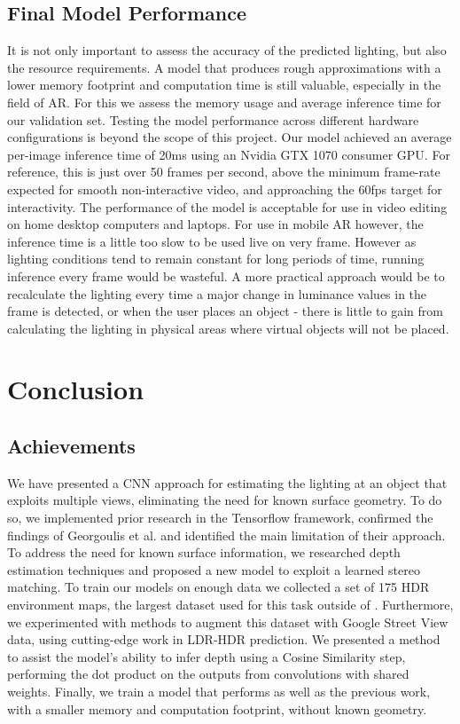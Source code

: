 \documentclass[ %
                    author={Gavin Parker},
                supervisor={Dr. Neill Campbell},
                    degree={MEng},
                     title={Deep Learning for Illumination Estimation from Stereo Images},
                  subtitle={},
                      type={Research},
                      year={2018} ]{dissertation}
\begin{document}
\section{Final Model Performance}
It is not only important to assess the accuracy of the predicted lighting, but also the resource requirements. A model that produces rough approximations with a lower memory footprint and computation time is still valuable, especially in the field of AR. For this we assess the memory usage and average inference time for our validation set. Testing the model performance across different hardware configurations is beyond the scope of this project. Our model achieved an average per-image inference time of 20ms using an Nvidia GTX 1070 consumer GPU. For reference, this is just over 50 frames per second, above the minimum frame-rate expected for smooth non-interactive video, and approaching the 60fps target for interactivity. The performance of the model is acceptable for use in video editing on home desktop computers and laptops. For use in mobile AR however, the inference time is a little too slow to be used live on very frame. However as lighting conditions tend to remain constant for long periods of time, running inference every frame would be wasteful. A more practical approach would be to recalculate the lighting every time a major change in luminance values in the frame is detected, or when the user places an object - there is little to gain from calculating the lighting in physical areas where virtual objects will not be placed.
\chapter{Conclusion}
\label{chap:conclusion}
\section{Achievements}
We have presented a CNN approach for estimating the lighting at an object that exploits multiple views, eliminating the need for known surface geometry. To do so, we implemented prior research in the Tensorflow framework, confirmed the findings of Georgoulis et al. and identified the main limitation of their approach. To address the need for known surface information, we researched depth estimation techniques and proposed a new model to exploit a learned stereo matching. To train our models on enough data we collected a set of 175 HDR environment maps, the largest dataset used for this task outside of \cite{gardner-sigasia-17}. Furthermore, we experimented with methods to augment this dataset with Google Street View data, using cutting-edge work in LDR-HDR prediction. We presented a method to assist the model's ability to infer depth using a Cosine Similarity step, performing the dot product on the outputs from convolutions with shared weights. Finally, we train a model that performs as well as the previous work, with a smaller memory and computation footprint, without known geometry.
\end{document}

